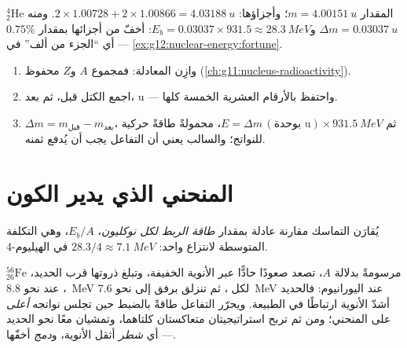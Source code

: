 \begin{example}[الهيليوم-4]\label{ex:g12:nuclear-energy:helium}
 ${}^{4}_{2}\mathrm{He}$ المقدار $m = \qty{4.00151}{u}$؛ وأجزاؤها:
$2 \times 1.00728 + 2 \times 1.00866 = \qty{4.03188}{u}$. ومنه
$\Delta m = \qty{0.03037}{u}$ و$E_b = 0.03037 \times 931.5 \approx
\qty{28.3}{MeV}$:  أخفّ من أجزائها بمقدار $0.75\%$ --- أي
``الجزء من ألف'' في \cref{ex:g12:nuclear-energy:fortune}.
\end{example}

\begin{method}\label{met:g12:nuclear-energy:balance}
\begin{enumerate}
  \item وازِن المعادلة: فمجموع $A$ و$Z$ محفوظ (\cref{ch:g11:nucleus-radioactivity}).
  \item اجمع الكتل قبل، ثم بعد،  \unit{u} --- واحتفظ بالأرقام العشرية الخمسة كلها.
  \item $\Delta m = m_{\text{قبل}} - m_{\text{بعد}}$، ثم
        $E = \Delta m\,(\text{بوحدة u}) \times \qty{931.5}{MeV}$، محمولةً
        طاقةً حركية للنواتج؛ والسالب يعني أن التفاعل يجب أن يُدفع ثمنه.
\end{enumerate}
\end{method}

\section{المنحني الذي يدير الكون}

\begin{definition}\label{def:g12:nuclear-energy:pernucleon}
يُقارَن التماسك مقارنة عادلة بمقدار \emph{طاقة الربط لكل
نوكليون}، $E_b/A$، وهي التكلفة المتوسطة
لانتزاع  واحد: $28.3/4 \approx \qty{7.1}{MeV}$ في الهيليوم-4.
\end{definition}

\begin{proposition}\label{prop:g12:nuclear-energy:ironpeak}
مرسومةً بدلالة $A$، تصعد  صعودًا حادًّا عبر
الأنوية الخفيفة، وتبلغ ذروتها قرب الحديد، ${}^{56}_{26}\mathrm{Fe}$، عند نحو
\qty{8.8}{MeV} لكل ، ثم تنزلق برفق إلى نحو \qty{7.6}{MeV} عند
اليورانيوم: فالحديد أشدّ الأنوية ارتباطًا في الطبيعة. ويحرّر التفاعل
طاقةً بالضبط حين تجلس نواتجه \emph{أعلى} على المنحني؛ ومن ثم تربح
استراتيجيتان متعاكستان كلتاهما، وتمشيان معًا نحو الحديد ---
أي \emph{شطر} أثقل الأنوية، و\emph{دمج} أخفّها.
\end{proposition}
\admitted

